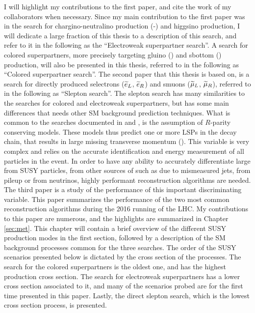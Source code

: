I will highlight my contributions to the first paper, and cite the work of my collaborators when necessary. 
Since my main contribution to the first paper was in the search for chargino-neutralino production (\firstcharg-\secondchi) and higgsino production, I will dedicate a large fraction of this thesis to a description of this search, and refer to it in the following as the ``Electroweak superpartner search''.
A search for colored superpartners, more precisely targeting gluino (\gluino) and sbottom (\sbottom) production, will also be presented in this thesis, referred to in the following as ``Colored superpartner search''.
The second paper that this thesis is based on, is a search for directly produced selectrons ($\widetilde{e}_{L}$, $\widetilde{e}_{R}$) and smuons ($\widetilde{\mu}_{L}$, $\widetilde{\mu}_{R}$), referred to in the following as ``Slepton search''. 
The slepton search has many similarities to the searches for colored and electroweak superpartners, but has some main differences that needs other SM background prediction techniques. 
What is common to the searches documented in \cite{Sirunyan:2017qaj} and \cite{Sirunyan:2018nwe}, is the assumption of $R$-parity conserving models. 
These models thus predict one or more LSPs in the decay chain, that results in large missing transverse momentum (\ptmiss). 
This variable is very complex and relies on the accurate identification and energy measurement of all particles in the event. 
In order to have any ability to accurately differentiate large \ptmiss from SUSY particles, from other sources of \ptmiss such as due to mismeasured jets, from pileup or from neutrinos, highly performant \ptmiss reconstruction algorithms are needed. 
The third paper \cite{Sirunyan:2019kia} is a study of the performance of this important discriminating variable. 
This paper summarizes the performance of the two most common \ptmiss reconstruction algorithms during the 2016 running of the LHC. 
My contributions to this paper are numerous, and the highlights are summarized in Chapter \ref{sec:met}. 
\newpara
\noindent\justify
This chapter will contain a brief overview of the different SUSY production modes in the first section, followed by a description of the SM background processes common for the three searches. 
The order of the SUSY scenarios presented below is dictated by the cross section of the processes. 
The search for the colored superpartners is the oldest one, and has the highest production cross section. 
The search for electroweak superpartners has a lower cross section associated to it, and many of the scenarios probed are for the first time presented in this paper. 
Lastly, the direct slepton search, which is the lowest cross section process, is presented. 
